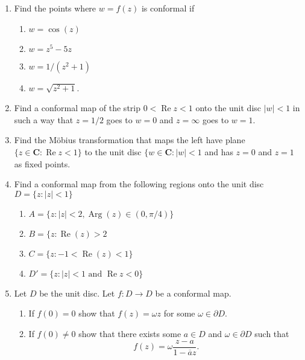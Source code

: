 \documentclass[a4paper,10pt]{article}
\title{}
\author{Dupuy --- Complex Analysis --- Spring 2017 --- Homework 05}
\date{}
\newcommand{\CC}{\mathbf{C}}
\renewcommand{\Re}{\operatorname{Re}}
\newcommand{\Arg}{\operatorname{Arg}}
\begin{document}
\maketitle



\begin{enumerate}

\subsection*{Conformal Maps}
\item Find the points where $w = f(z)$ is conformal if 
\begin{enumerate}
\item $w = \cos(z)$
\item $w = z^5 - 5z$
\item $w = 1/(z^2+1)$
\item $w = \sqrt{z^2+1}$.
\end{enumerate}

\item Find a conformal map of the strip $0 < \Re z < 1$ onto the unit disc $\vert w \vert < 1$ in such a way that $z=1/2 $ goes to $ w=0$ and $z = \infty$ goes to $w=1$.

\item Find the M\"obius transformation that maps the left have plane $\lbrace z \in \CC: \Re z < 1 \rbrace$ to the unit disc $\lbrace w \in \CC : \vert w \vert < 1$ and has $z=0$ and $z=1$ as fixed points.

\item Find a conformal map from the following regions onto the unit disc $D = \lbrace z : \vert z \vert < 1 \rbrace$
\begin{enumerate}
\item $A = \lbrace z: \vert z \vert < 2,  \Arg(z) \in (0,\pi/4) \rbrace $
\item $B = \lbrace z: \Re(z) >2 $
\item $C = \lbrace z: -1<\Re(z)<1 \rbrace$
\item $D' = \lbrace z: \vert z \vert < 1 \mbox{ and } \Re z < 0\rbrace $ 
\end{enumerate}

\item Let $D$ be the unit disc. Let $f: D \to D$ be a conformal map. 
\begin{enumerate}
\item If $f(0) = 0$ show that $f(z) = \omega z$ for some $\omega \in \partial D$. 
\item If $f(0) \neq 0$ show that there exists some $a \in D$ and $\omega \in \partial D$ such that 
 $$ f(z) = \omega \frac{z - a}{1 - \overline{a} z}.$$
\end{enumerate}


\end{enumerate}
\end{document}
